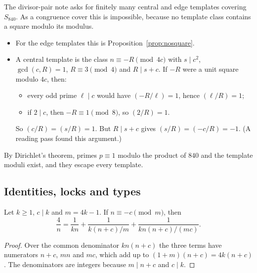 The divisor-pair note asks for finitely many central and edge templates covering $S_{840}$. As a congruence cover this is impossible, because no template class contains a square modulo its modulus.
\begin{itemize}
\item For the edge templates this is Proposition~\ref{prop:nosquare}.
\item A central template is the class $n\equiv-R\pmod{4c}$ with $s\mid c^2$, $\gcd(c,R)=1$, $R\equiv3\pmod4$ and $R\mid s+c$. If $-R$ were a unit square modulo $4c$, then:
\begin{itemize}
\item every odd prime $\ell\mid c$ would have $(-R/\ell)=1$, hence $(\ell/R)=1$;
\item if $2\mid c$, then $-R\equiv1\pmod8$, so $(2/R)=1$.
\end{itemize}
So $(c/R)=(s/R)=1$. But $R\mid s+c$ gives $(s/R)=(-c/R)=-1$. (A reading pass found this argument.)
\end{itemize}
By Dirichlet's theorem, primes $p\equiv1$ modulo the product of $840$ and the template moduli exist, and they escape every template.

\subsection{Identities, locks and types}\label{ssec:locks}

\begin{proposition}\label{prop:rosati}
Let $k\ge1$, $c\mid k$ and $m=4k-1$. If $n\equiv-c\pmod m$, then
\[
\frac4n=\frac1{kn}+\frac1{k(n+c)/m}+\frac1{kn(n+c)/(mc)}.
\]
\end{proposition}
\begin{proof}
Over the common denominator $kn(n+c)$ the three terms have numerators $n+c$, $mn$ and $mc$, which add up to $(1+m)(n+c)=4k(n+c)$. The denominators are integers because $m\mid n+c$ and $c\mid k$.
\end{proof}

